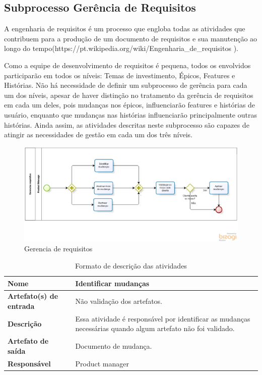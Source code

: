 \subsection{Subprocesso Gerência de Requisitos}

A engenharia de requisitos é um processo que engloba todas as atividades que contribuem para a produção de um documento de requisitos e sua manutenção ao longo do tempo(https://pt.wikipedia.org/wiki/Engenharia\_de\_requisitos ).

Como a equipe de desenvolvimento de requisitos é pequena, todos os envolvidos participarão em todos os níveis: Temas de investimento, Épicos, Features e Histórias. Não há necessidade de definir um subprocesso de gerência para cada um dos níveis, apesar de haver distinção no tratamento da gerência de requisitos em cada um deles, pois mudanças nos épicos, influenciarão features e histórias de usuário, enquanto que mudanças nas histórias influenciarão principalmente outras histórias. Ainda assim, as atividades descritas neste subprocesso são capazes de atingir as necessidades de gestão em cada um dos três níveis.

\begin{figure}[H]
    \centering
    \caption{Gerencia de requisitos}
    \label{processoGerencia}
    \includegraphics[keepaspectratio=true,scale=0.5]{figuras/processoGerencia.eps}
\end{figure}

\begin{table}[h]
    \centering
    \label{descricaoAtividades}
    \caption{Formato de descrição das atividades}
        \begin{tabular}{|l|p{10cm}|}
        \hline
        \textbf{Nome} & Identificar mudanças \\
        \hline
        \textbf{Artefato(s) de entrada} & Não validação dos artefatos. \\
        \hline
        \textbf{Descrição} & Essa atividade é responsável por identificar as mudanças necessárias quando algum artefato não foi validado. \\
        \hline
        \textbf{Artefato de saída} & Documento de mudança. \\
        \hline
        \textbf{Responsável} & Product manager \\
        \hline
    \end{tabular}
\end{table}

